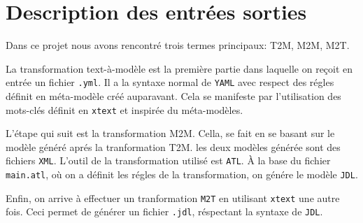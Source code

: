 
\section{Description des entrées sorties}

Dans ce projet nous avons rencontré trois termes principaux: T2M, M2M,
M2T.

La transformation text-à-modèle est la première partie dans laquelle
on reçoit en entrée un fichier \texttt{.yml}. Il a la syntaxe normal
de \texttt{YAML} avec respect des régles définit en méta-modèle créé
auparavant. Cela se manifeste par l'utilisation des mots-clés définit
en \texttt{xtext} et inspirée du méta-modèles.\\
\begin{figure}[H]
  \begin{center}
      \caption{}
  \end{center}
\end{figure}

L'étape qui suit est la transformation M2M. Cella, se fait en se
basant sur le modèle généré aprés la tranformation T2M. les deux
modèles générée sont des fichiers \texttt{XML}. L'outil de la
transformation utilisé est \texttt{ATL}. À la base du fichier
\texttt{main.atl}, où on a définit les régles de la transformation, on
génére le modèle \texttt{JDL}.\\
\begin{figure}[H]
  \begin{center}
      \caption{}
  \end{center}
\end{figure}

Enfin, on arrive à effectuer un tranformation \texttt{M2T} en
utilisant \texttt{xtext} une autre fois. Ceci permet de générer un
fichier \texttt{.jdl}, réspectant la syntaxe de \texttt{JDL}.\\
\begin{figure}[H]
  \begin{center}
      \caption{}
  \end{center}
\end{figure}

